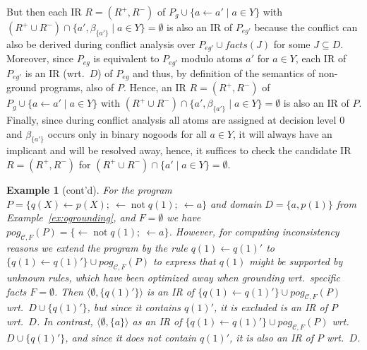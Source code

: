 \documentclass[11pt,fleqn,twoside]{article}
\def\naf{\ensuremath{\mathop{not}}}
\newcommand{\Program}{\ensuremath{P}}
\newcommand{\toFacts}[1]{\mathit{facts}(#1)}
\newtheorem{example}{Example}
\begin{document}
{				But then each IR $R = (R^{+}, R^{-})$ of $\Program_g \cup \{ a \leftarrow a' \mid a \in Y \}$
				with $(R^{+} \cup R^{-}) \cap \{ a', \beta_{\{a'\}} \mid a \in Y \} = \emptyset$ is also an IR of $\Program_{\mathit{eg}'}$
				because the conflict can also be derived during conflict analysis over $\Program_{\mathit{eg}'} \cup \toFacts{J}$ for some $J \subseteq D$.
				Moreover, since $\Program_{\mathit{eg}}$ is equivalent to $\Program_{\mathit{eg}'}$ modulo atoms $a'$ for $a \in Y$,
				each IR of $\Program_{\mathit{eg}'}$ is an IR (wrt.~$D$) of $\Program_{\mathit{eg}}$ and thus, by definition of the semantics of non-ground programs, also of $\Program$.
				Hence, an IR $R = (R^{+}, R^{-})$ of $\Program_g \cup \{ a \leftarrow a' \mid a \in Y \}$ with $(R^{+} \cup R^{-}) \cap \{ a', \beta_{\{a'\}} \mid a \in Y \} = \emptyset$ is also an IR of $\Program$.
				Finally, since during conflict analysis all atoms are assigned at decision level $0$ and $\beta_{\{ a' \}}$ occurs only in binary nogoods for all $a \in Y$,
				it will always have an implicant and will be resolved away, hence, it suffices to check the candidate IR $R = (R^{+}, R^{-})$ for $(R^{+} \cup R^{-}) \cap \{ a' \mid a \in Y \} = \emptyset$.
			}

			\begin{example}[cont'd]
				\label{ex:pogrounding2}
				For the program $\Program = \{ q(X) \leftarrow p(X); \ \leftarrow \naf q(1); \ \leftarrow a \}$ and domain $D = \{ a, p(1) \}$ from Example~\ref{ex:ogrounding},
				and $F = \emptyset$ we have $\mathit{pog}_{\mathcal{C}, F}(\Program) = \{ \leftarrow \naf q(1); \ \leftarrow a \}$.
				However, for computing inconsistency reasons we
				extend the program by the rule $q(1) \leftarrow q(1)'$
				to $\{ q(1) \leftarrow q(1)' \} \cup \mathit{pog}_{\mathcal{C}, F}(\Program)$
				to express that $q(1)$ might be supported by unknown rules, which have been optimized away when grounding wrt.~specific facts $F = \emptyset$.
				Then $\langle \emptyset, \{ q(1)' \} \rangle$ is an IR of $\{ q(1) \leftarrow q(1)' \} \cup \mathit{pog}_{\mathcal{C}, F}(\Program)$ wrt.~$D \cup \{ q(1)' \}$,
				but since it contains $q(1)'$, it is excluded is an IR of $\Program$ wrt.~$D$.
				In contrast, $\langle \emptyset, \{ a \} \rangle$ as an IR of $\{ q(1) \leftarrow q(1)' \} \cup \mathit{pog}_{\mathcal{C}, F}(\Program)$ wrt.~$D \cup \{ q(1)' \}$,
				and since it does not contain $q(1)'$, it is also an IR of $\Program$ wrt.~$D$.
			\end{example}
\end{document}
